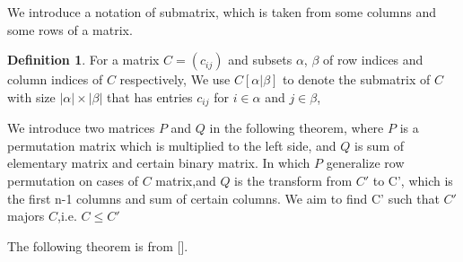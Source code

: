 \documentclass{article}
\theoremstyle{plain}
\theoremstyle{definition}
\newtheorem{defn}[thm]{Definition}
\begin{document}
    We introduce a notation of submatrix, which is taken from some columns and some rows of a
     matrix.

\begin{defn}
    For a matrix $C=(c_{ij})$ and subsets $\alpha$, $\beta$ of row indices and column 
    indices of $C$ respectively,  We use $C[\alpha|\beta]$ to denote the 
    submatrix of $C$ with size $ |\alpha| \times |\beta| $ that has entries $c_{ij}$ for $i\in \alpha$
    and $j\in\beta$,
\end{defn}


We introduce two matrices $P$ and $Q$ in the following theorem, where $P$ is a permutation
 matrix which is multiplied to the left side, and $Q$ is sum of elementary matrix and
 certain binary matrix. In which $P$ generalize row permutation on cases of $C$
 matrix,and $Q$ is the transform from $C'$ to C', which is the first n-1 columns
  and sum of certain columns. We aim to find C' such that $C'$ majors $C$,i.e. $C\leq C'$
 
The following theorem is from [].\cite{content}
\end{document}
